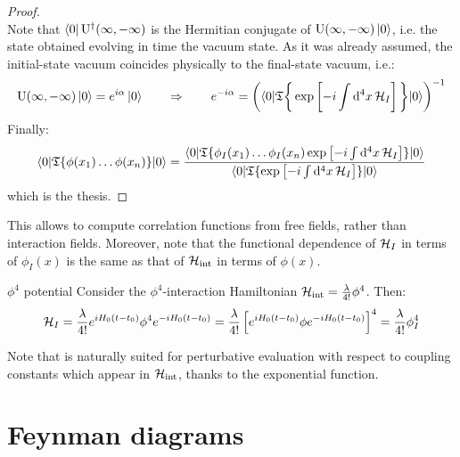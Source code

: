 \begin{proofbox}
\begin{proof}
\begin{equation*}
    \end{equation*}
    Note that $ \bra{0} \mathrm{U}^\dagger(\infty,-\infty) $ is the Hermitian conjugate of $ \mathrm{U}(\infty,-\infty) \ket{0} $, i.e. the state obtained evolving in time the vacuum state. As it was already assumed, the initial-state vacuum coincides physically to the final-state vacuum, i.e.:
    \begin{equation*}
      \mathrm{U}(\infty,-\infty) \ket{0} = e^{i\alpha} \ket{0}
      \qquad \Rightarrow \qquad
      e^{-i \alpha} = \left( \braket{0 | \mathfrak{T}\bigg\{ \exp \left[ -i \int \mathrm{d}^4x\, \mathcal{H}_I \right] \bigg\} | 0} \right)^{-1}
    \end{equation*}
    Finally:
    \begin{equation*}
    \braket{0 | \mathfrak{T}\{\phi(x_1) \dots \phi(x_n)\} | 0} = \frac{\braket{0 | \mathfrak{T}\{\phi_I(x_1) \dots \phi_I(x_n) \exp \left[ -i \int \mathrm{d}^4x\, \mathcal{H}_I \right]\} | 0}}{\braket{0 | \mathfrak{T}\{\exp \left[ -i \int \mathrm{d}^4x\, \mathcal{H}_I \right]\} |0}}
    \end{equation*}
    which is the thesis.
  \end{proof}
\end{proofbox}

This allows to compute correlation functions from free fields, rather than interaction fields. Moreover, note that the functional dependence of $ \mathcal{H}_I $ in terms of $ \phi_I(x) $ is the same as that of $ \mathcal{H}_\text{int} $ in terms of $ \phi(x) $.

\begin{example}{$ \phi^4 $ potential}{}
  Consider the $ \phi^4 $-interaction Hamiltonian $ \mathcal{H}_\text{int} = \frac{\lambda}{4!} \phi^4 $. Then:
  \begin{equation*}
    \begin{split}
      \mathcal{H}_I = \frac{\lambda}{4!} e^{i H_0 (t-t_0)} \phi^4 e^{-i H_0 (t-t_0)} = \frac{\lambda}{4!} \left[ e^{i H_0 (t-t_0)} \phi e^{-i H_0 (t-t_0)} \right]^4 = \frac{\lambda}{4!} \phi_I^4
    \end{split}
  \end{equation*}
\end{example}

Note that  is naturally suited for perturbative evaluation with respect to coupling constants which appear in $ \mathcal{H}_\text{int} $, thanks to the exponential function.

\newpage

\section{Feynman diagrams}

